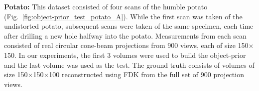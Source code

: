 \documentclass[journal]{IEEEtran}
\begin{document}

\textbf{Potato:} This dataset consisted of four scans of the humble potato (Fig.~\ref{fig:object-prior_test_potato_A}). While the first scan was taken of the undistorted potato, subsequent scans were taken of the same specimen, each time after drilling a new hole halfway into the potato. Measurements from each scan consisted of real circular cone-beam projections from 900 views, each of size 150$\times$150. %
In our experiments, the first 3 volumes were used to build the object-prior and the
last volume was used as the test. The ground truth consists of volumes of size 150$\times$150$\times$100 reconstructed using FDK from the full set of 900 projection views. 
\end{document}
